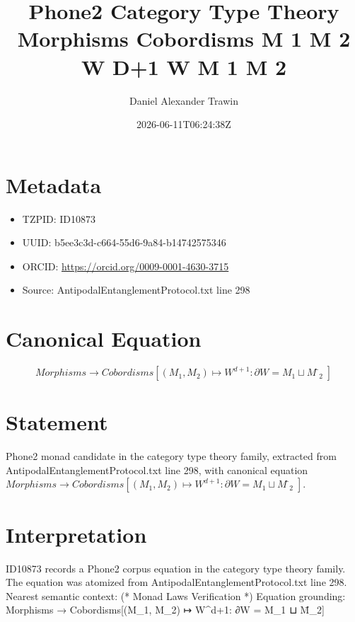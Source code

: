 \documentclass[11pt]{article}
\title{Phone2 Category Type Theory Morphisms Cobordisms M 1 M 2 W D+1 W M 1 M 2}
\author{Daniel Alexander Trawin}
\date{2026-06-11T06:24:38Z}
\begin{document}
\maketitle
\section*{Metadata}
\begin{itemize}
\item TZPID: ID10873
\item UUID: b5ee3c3d-c664-55d6-9a84-b14742575346
\item ORCID: \url{https://orcid.org/0009-0001-4630-3715}
\item Source: AntipodalEntanglementProtocol.txt line 298
\end{itemize}
\section*{Canonical Equation}
\[
Morphisms → Cobordisms[(M_1, M_2) ↦ W^{d+1}: ∂W = M_1 ⊔ M̄_2]
\]
\section*{Statement}
Phone2 monad candidate in the category type theory family, extracted from AntipodalEntanglementProtocol.txt line 298, with canonical equation $Morphisms → Cobordisms[(M_1, M_2) ↦ W^{d+1}: ∂W = M_1 ⊔ M̄_2]$.
\section*{Interpretation}
ID10873 records a Phone2 corpus equation in the category type theory family. The equation was atomized from AntipodalEntanglementProtocol.txt line 298. Nearest semantic context: (* Monad Laws Verification *) Equation grounding: Morphisms → Cobordisms[(M_1, M_2) ↦ W^{d+1}: ∂W = M_1 ⊔ M̄_2]
\end{document}
